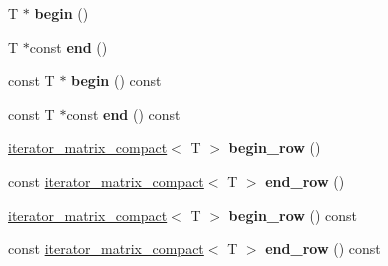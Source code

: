 \begin{DoxyCompactItemize}
\item 
T $\ast$ {\bfseries begin} ()\hypertarget{classmalgo_1_1matrix__compact__basic_aa4b9c95989a68a1039475c967333d1e0}{}\label{classmalgo_1_1matrix__compact__basic_aa4b9c95989a68a1039475c967333d1e0}

\item 
T $\ast$const {\bfseries end} ()\hypertarget{classmalgo_1_1matrix__compact__basic_a6f58796eddf07ab0aa8fc2aae7260c0e}{}\label{classmalgo_1_1matrix__compact__basic_a6f58796eddf07ab0aa8fc2aae7260c0e}

\item 
const T $\ast$ {\bfseries begin} () const \hypertarget{classmalgo_1_1matrix__compact__basic_ae98e2573cbd91b479a0faa2078cc8e9a}{}\label{classmalgo_1_1matrix__compact__basic_ae98e2573cbd91b479a0faa2078cc8e9a}

\item 
const T $\ast$const {\bfseries end} () const \hypertarget{classmalgo_1_1matrix__compact__basic_a3f334946eb3a6df4c404a43df26ef76f}{}\label{classmalgo_1_1matrix__compact__basic_a3f334946eb3a6df4c404a43df26ef76f}

\item 
\hyperlink{structmalgo_1_1iterator__matrix__compact}{iterator\+\_\+matrix\+\_\+compact}$<$ T $>$ {\bfseries begin\+\_\+row} ()\hypertarget{classmalgo_1_1matrix__compact__basic_ace7e722afb4383d6b6187a9946b4bc3f}{}\label{classmalgo_1_1matrix__compact__basic_ace7e722afb4383d6b6187a9946b4bc3f}

\item 
const \hyperlink{structmalgo_1_1iterator__matrix__compact}{iterator\+\_\+matrix\+\_\+compact}$<$ T $>$ {\bfseries end\+\_\+row} ()\hypertarget{classmalgo_1_1matrix__compact__basic_a3596210ca2966369b87d58cb3a4a2da7}{}\label{classmalgo_1_1matrix__compact__basic_a3596210ca2966369b87d58cb3a4a2da7}

\item 
\hyperlink{structmalgo_1_1iterator__matrix__compact}{iterator\+\_\+matrix\+\_\+compact}$<$ T $>$ {\bfseries begin\+\_\+row} () const \hypertarget{classmalgo_1_1matrix__compact__basic_a1b37a138823b284da07d771c7deee719}{}\label{classmalgo_1_1matrix__compact__basic_a1b37a138823b284da07d771c7deee719}

\item 
const \hyperlink{structmalgo_1_1iterator__matrix__compact}{iterator\+\_\+matrix\+\_\+compact}$<$ T $>$ {\bfseries end\+\_\+row} () const \hypertarget{classmalgo_1_1matrix__compact__basic_a5a461cf79f97d534591ec88a36b34e47}{}\label{classmalgo_1_1matrix__compact__basic_a5a461cf79f97d534591ec88a36b34e47}


\end{DoxyCompactItemize}
